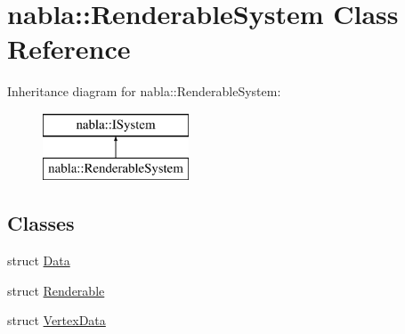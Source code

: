 \hypertarget{classnabla_1_1_renderable_system}{}\section{nabla\+::Renderable\+System Class Reference}
\label{classnabla_1_1_renderable_system}
Inheritance diagram for nabla\+::Renderable\+System\+:\begin{figure}[H]
\begin{center}
\leavevmode
\includegraphics[height=2.000000cm]{classnabla_1_1_renderable_system}
\end{center}
\end{figure}
\subsection*{Classes}
\begin{DoxyCompactItemize}
\item 
struct \mbox{\hyperlink{structnabla_1_1_renderable_system_1_1_data}{Data}}
\item 
struct \mbox{\hyperlink{structnabla_1_1_renderable_system_1_1_renderable}{Renderable}}
\item 
struct \mbox{\hyperlink{structnabla_1_1_renderable_system_1_1_vertex_data}{Vertex\+Data}}
\end{DoxyCompactItemize}
